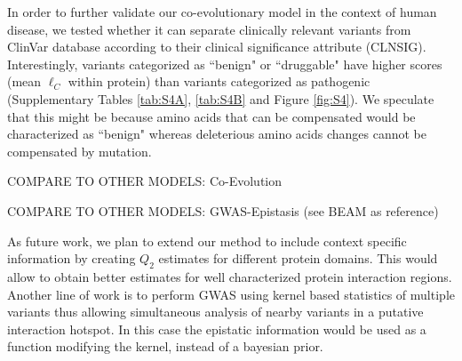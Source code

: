 In order to further validate our co-evolutionary model in the context of human disease, we tested whether it can separate clinically relevant variants from ClinVar database \cite{landrum2013clinvar} according to their clinical significance attribute (CLNSIG). Interestingly, variants categorized as ``benign" or ``druggable" have higher scores (mean $\ell_C$ within protein) than variants categorized as pathogenic (Supplementary Tables \ref{tab:S4A}, \ref{tab:S4B} and Figure \ref{fig:S4}). We speculate that this might be because amino acids that can be compensated would be characterized as ``benign" whereas deleterious amino acids changes cannot be compensated by mutation. 


COMPARE TO OTHER MODELS: Co-Evolution



COMPARE TO OTHER MODELS: GWAS-Epistasis (see BEAM as reference)



As future work, we plan to extend our method to include context specific information by creating $Q_2$ estimates for different protein domains. This would allow to obtain better estimates for well characterized protein interaction regions. Another line of work is to perform GWAS using kernel based statistics of multiple variants \cite{wu2011rare} thus allowing simultaneous analysis of nearby variants in a putative interaction hotspot. In this case the epistatic information would be used as a function modifying the kernel, instead of a bayesian prior.
